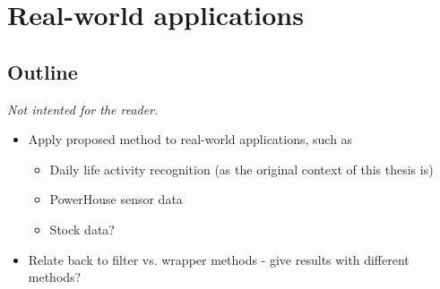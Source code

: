 
\chapter{Real-world applications}

\label{Chapter6} %


\section{Outline}
\emph{Not intented for the reader.}
\begin{itemize}
  \item Apply proposed method to real-world applications, such as
    \begin{itemize}
      \item Daily life activity recognition (as the original context of this thesis is)
      \item PowerHouse sensor data
      \item Stock data?
    \end{itemize}
  \item Relate back to filter vs. wrapper methods - give results with different methods?
\end{itemize}